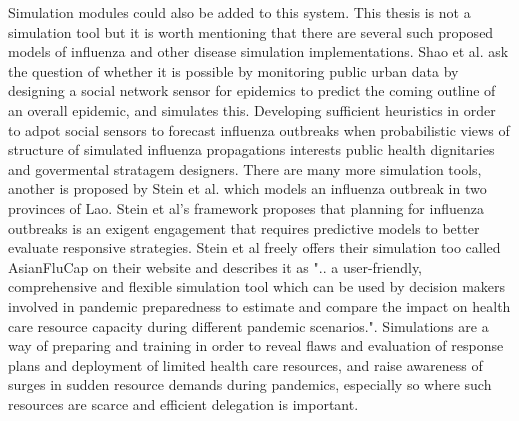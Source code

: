Simulation modules could also be added to this system. This thesis is not a simulation tool but it is worth mentioning that there are several such proposed models of influenza and other disease simulation implementations. Shao et al. \cite{shao2016forecasting} ask the question of whether it is possible by monitoring public urban data by designing a social network sensor for epidemics to predict the coming outline of an overall epidemic, and simulates this. Developing sufficient heuristics in order to adpot social sensors to forecast influenza outbreaks when probabilistic views of structure of simulated influenza propagations interests public health dignitaries and govermental stratagem designers. There are many more simulation tools, another is proposed by Stein et al. \cite{stein2012development} which models an influenza outbreak in two provinces of Lao. Stein et al's framework proposes that planning for influenza outbreaks is an exigent engagement that requires predictive models to better evaluate responsive strategies. Stein et al freely offers their simulation too called AsianFluCap on their website and describes it as ".. a user-friendly, comprehensive and flexible simulation tool which can be used by decision makers involved in pandemic preparedness to estimate and compare the impact on health care resource capacity during different pandemic scenarios.". Simulations are a way of preparing and training in order to reveal flaws and evaluation of response plans and deployment of limited health care resources, and raise awareness of surges in sudden resource demands during pandemics, especially so where such resources are scarce and efficient delegation is important.

